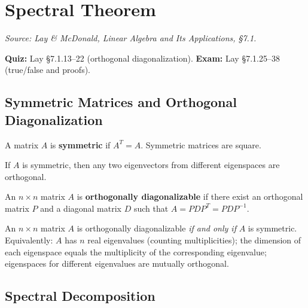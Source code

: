 \chapter{Spectral Theorem}

\noindent\textit{Source: Lay \& McDonald, \textit{Linear Algebra and Its Applications}, \S7.1.}

\begin{remark}
\textbf{Quiz:} Lay \S7.1.13--22 (orthogonal diagonalization). \textbf{Exam:} Lay \S7.1.25--38 (true/false and proofs).
\end{remark}

\section{Symmetric Matrices and Orthogonal Diagonalization}

\begin{definition}
A matrix $A$ is \textbf{symmetric} if $A^T=A$. Symmetric matrices are square.
\end{definition}

\begin{theorem}
If $A$ is symmetric, then any two eigenvectors from different eigenspaces are orthogonal.
\end{theorem}

\begin{definition}
An $n\times n$ matrix $A$ is \textbf{orthogonally diagonalizable} if there exist an orthogonal matrix $P$ and a diagonal matrix $D$ such that $A=PDP^T=PDP^{-1}$.
\end{definition}

\begin{theorem}
An $n\times n$ matrix $A$ is orthogonally diagonalizable \emph{if and only if} $A$ is symmetric. Equivalently: $A$ has $n$ real eigenvalues (counting multiplicities); the dimension of each eigenspace equals the multiplicity of the corresponding eigenvalue; eigenspaces for different eigenvalues are mutually orthogonal.
\end{theorem}

\section{Spectral Decomposition}

